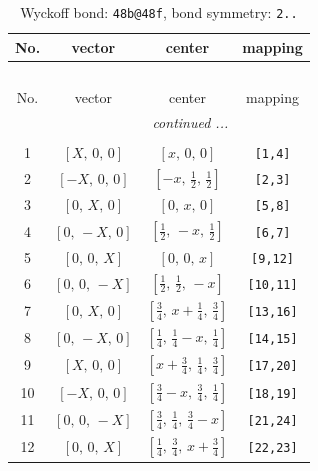 \documentclass[fleqn,8pt]{jsarticle}
\begin{document}
\renewcommand{\arraystretch}{1.2}
\begin{longtable}{cccc}
\caption{Wyckoff bond: {\tt 48b@48f}, bond symmetry: {\tt 2..}}
 \\
 \hline \hline
No. & vector & center & mapping \\ \hline \endfirsthead

\multicolumn{3}{l}{\tablename\ \thetable{}} \\
 \hline \hline
No. & vector & center & mapping \\ \hline \endhead

 \hline \hline
\multicolumn{3}{r}{\footnotesize\it continued ...} \\ \endfoot

 \hline \hline
\multicolumn{3}{r}{} \\ \endlastfoot

1 & $\left[ X,\, 0,\, 0 \right]$ & $\left[ x,\, 0,\, 0 \right]$ & {\tt [1,4]} \\ \hline
2 & $\left[ - X,\, 0,\, 0 \right]$ & $\left[ - x,\, \frac{1}{2},\, \frac{1}{2} \right]$ & {\tt [2,3]} \\ \hline
3 & $\left[ 0,\, X,\, 0 \right]$ & $\left[ 0,\, x,\, 0 \right]$ & {\tt [5,8]} \\ \hline
4 & $\left[ 0,\, - X,\, 0 \right]$ & $\left[ \frac{1}{2},\, - x,\, \frac{1}{2} \right]$ & {\tt [6,7]} \\ \hline
5 & $\left[ 0,\, 0,\, X \right]$ & $\left[ 0,\, 0,\, x \right]$ & {\tt [9,12]} \\ \hline
6 & $\left[ 0,\, 0,\, - X \right]$ & $\left[ \frac{1}{2},\, \frac{1}{2},\, - x \right]$ & {\tt [10,11]} \\ \hline
7 & $\left[ 0,\, X,\, 0 \right]$ & $\left[ \frac{3}{4},\, x + \frac{1}{4},\, \frac{3}{4} \right]$ & {\tt [13,16]} \\ \hline
8 & $\left[ 0,\, - X,\, 0 \right]$ & $\left[ \frac{1}{4},\, \frac{1}{4} - x,\, \frac{1}{4} \right]$ & {\tt [14,15]} \\ \hline
9 & $\left[ X,\, 0,\, 0 \right]$ & $\left[ x + \frac{3}{4},\, \frac{1}{4},\, \frac{3}{4} \right]$ & {\tt [17,20]} \\ \hline
10 & $\left[ - X,\, 0,\, 0 \right]$ & $\left[ \frac{3}{4} - x,\, \frac{3}{4},\, \frac{1}{4} \right]$ & {\tt [18,19]} \\ \hline
11 & $\left[ 0,\, 0,\, - X \right]$ & $\left[ \frac{3}{4},\, \frac{1}{4},\, \frac{3}{4} - x \right]$ & {\tt [21,24]} \\ \hline
12 & $\left[ 0,\, 0,\, X \right]$ & $\left[ \frac{1}{4},\, \frac{3}{4},\, x + \frac{3}{4} \right]$ & {\tt [22,23]} \\
\end{longtable}
\end{document}
